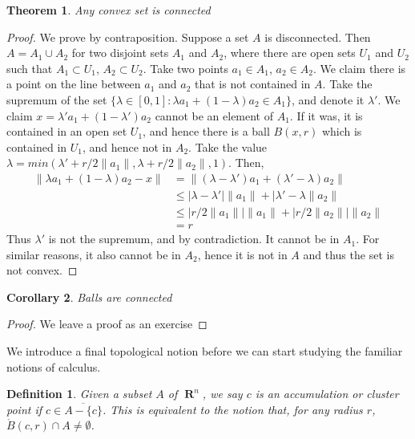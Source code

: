 \documentclass{report}
\newtheorem{theorem}{Theorem}[chapter]
\newtheorem{corollary}[theorem]{Corollary}
\newtheorem{definition}{Definition}
\DeclareMathOperator{\real}{\mathbf{R}}
\begin{document}
\begin{theorem}
  Any convex set is connected
\end{theorem}
\begin{proof}
  We prove by contraposition. Suppose a set $A$ is disconnected. Then $A = A_1 \cup A_2$ for two disjoint sets $A_1$ and $A_2$, where there are open sets $U_1$ and $U_2$ such that $A_1 \subset U_1$, $A_2 \subset U_2$. Take two points $a_1 \in A_1$, $a_2 \in A_2$. We claim there is a point on the line between $a_1$ and $a_2$ that is not contained in $A$. Take the supremum of the set $\{ \lambda \in [0,1] : \lambda a_1 + (1 - \lambda) a_2 \in A_1 \}$, and denote it $\lambda'$. We claim $x = \lambda' a_1 + (1 - \lambda') a_2$ cannot be an element of $A_1$. If it was, it is contained in an open set $U_1$, and hence there is a ball $B(x,r)$ which is contained in $U_1$, and hence not in $A_2$. Take the value $\lambda = min(\lambda' + r/2\|a_1\|, \lambda + r/2\|a_2\|, 1)$. Then,
  \begin{align*}
  \| \lambda a_1 + (1 - \lambda) a_2 - x \| &= \| (\lambda - \lambda') a_1 + (\lambda' - \lambda) a_2 \|\\
      &\leq |\lambda - \lambda'| \| a_1 \| + |\lambda' - \lambda \|a_2\|\\
      &\leq |r/2\|a_1\|| \|a_1\| + |r/2\|a_2\|| \|a_2\|\\
      &= r
  \end{align*}
  Thus $\lambda'$ is not the supremum, and by contradiction. It cannot be in $A_1$. For similar reasons, it also cannot be in $A_2$, hence it is not in $A$ and thus the set is not convex.
\end{proof}

\begin{corollary}
  Balls are connected
\end{corollary}
\begin{proof}
  We leave a proof as an exercise
\end{proof}

We introduce a final topological notion before we can start studying the familiar notions of calculus.

\begin{definition}
  Given a subset $A$ of $\real^n$, we say $c$ is an accumulation or cluster point if $c \in \overline{A - \{c\}}$. This is equivalent to the notion that, for any radius $r$, $\mathring{B}(c,r) \cap A \neq \emptyset$.
\end{definition}
\end{document}
